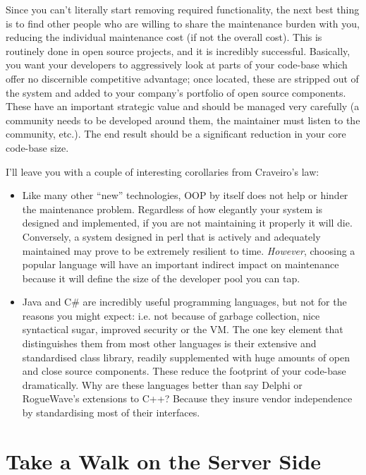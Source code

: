 \documentclass{memoir}
\begin{document}
Since you can't literally start removing required functionality, the
next best thing is to find other people who are willing to share the
maintenance burden with you, reducing the individual maintenance cost
(if not the overall cost). This is routinely done in open source
projects, and it is incredibly successful. Basically, you want your
developers to aggressively look at parts of your code-base which offer
no discernible competitive advantage; once located, these are stripped
out of the system and added to your company's portfolio of open source
components. These have an important strategic value and should be
managed very carefully (a community needs to be developed around them,
the maintainer must listen to the community, etc.). The end result
should be a significant reduction in your core code-base size.

I'll leave you with a couple of interesting corollaries from
Craveiro's law:

\begin{itemize}
\item Like many other ``new'' technologies, OOP by itself does not help
  or hinder the maintenance problem. Regardless of how elegantly your
  system is designed and implemented, if you are not maintaining it
  properly it will die. Conversely, a system designed in perl that is
  actively and adequately maintained may prove to be extremely
  resilient to time. \emph{However}, choosing a popular language will
  have an important indirect impact on maintenance because it will
  define the size of the developer pool you can tap.
\item Java and C\# are incredibly useful programming languages, but not
  for the reasons you might expect: i.e. not because of garbage
  collection, nice syntactical sugar, improved security or the VM. The
  one key element that distinguishes them from most other languages is
  their extensive and standardised class library, readily supplemented
  with huge amounts of open and close source components. These reduce
  the footprint of your code-base dramatically. Why are these
  languages better than say Delphi or RogueWave's extensions to C++?
  Because they insure vendor independence by standardising most of
  their interfaces.
\end{itemize}

\chapter{Take a Walk on the Server Side}
\end{document}
